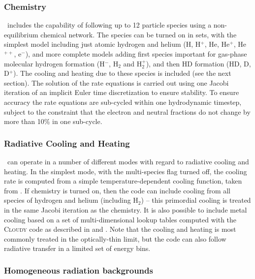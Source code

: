 \subsubsection{Chemistry}
\label{sec.ov.chem}

\enzo\ includes the capability of following up to 12 particle species
using a non-equilibrium chemical network.  The species can be turned
on in sets, with the simplest model including just atomic hydrogen and
helium (H, H$^+$, He, He$^+$, He$^{++}$, e$^-$), and more complete
models adding first species important for gas-phase molecular hydrogen
formation (H$^-$, H$_2$ and H$_2^+$), and then HD formation (HD, D,
D$^+$).
The cooling and heating due to these species is included (see the next
section). The solution of the rate equations is carried out using one
Jacobi iteration of an implicit Euler time discretization to ensure
stability. To ensure accuracy the rate equations are sub-cycled
within one hydrodynamic timestep, subject to the constraint that the
electron and neutral fractions do not change by more than 10\% in one
sub-cycle.

\subsubsection{Radiative Cooling and Heating}

\enzo\ can operate in a number of different modes with regard to
radiative cooling and heating. In the simplest mode, with the
multi-species flag turned off, the cooling rate is computed from a
simple temperature-dependent cooling function, taken from
\citet{SW87}.  If chemistry is turned on, then the code can include
cooling from all species of hydrogen and helium (including H$_2$) --
this primordial cooling is treated in the same Jacobi iteration as the
chemistry.  It is also possible to include metal cooling based on a
set of multi-dimensional lookup tables computed with the
\textsc{Cloudy} code \citep{1998PASP..110..761F} as described in
\citet{2008MNRAS.385.1443S} and \citet{2011ApJ...731....6S}. Note that
the cooling and heating is most commonly treated in the optically-thin
limit, but the code can also follow radiative transfer in a limited
set of energy bins.

\subsubsection{Homogeneous radiation backgrounds}

